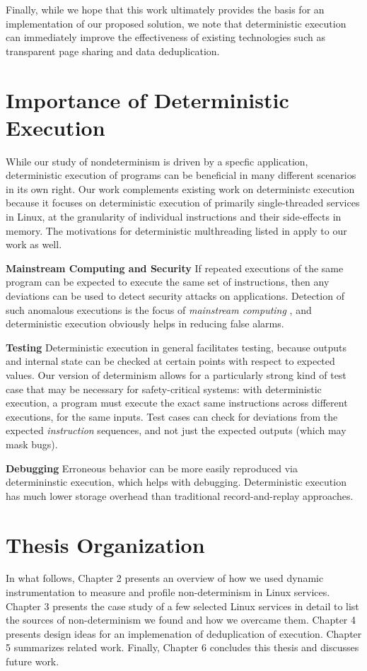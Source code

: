 Finally, while we hope that this work ultimately provides the basis for an implementation of our
proposed solution, we note that deterministic execution can immediately improve
the effectiveness of existing technologies such as transparent page sharing
and data deduplication.

\section{Importance of Deterministic Execution}
While our study of nondeterminism is driven by a specfic application,
deterministic execution of programs can be beneficial in many
different scenarios in its own right. Our work complements existing
work on deterministc execution because 
it focuses on deterministic execution of primarily single-threaded services in Linux,
at the granularity of individual instructions and their side-effects in
memory. The motivations for deterministic multhreading listed in
\cite{marek2011scaling, patil2010pinplay} apply to our work as well.

{\bf Mainstream Computing and Security} \newline
If repeated executions of the same program can be
expected to execute the same set of instructions, then
any deviations can be used to detect security
attacks on applications. Detection of such
anomalous executions is the focus of \emph{mainstream computing} \cite{stephenson2010mainstream},
and deterministic execution obviously helps in reducing false alarms.

{\bf Testing} \newline
Deterministic execution in general facilitates testing,
because outputs and internal state can be checked at 
certain points with respect to expected values. Our version
of determinism allows for a particularly strong kind
of test case that may be necessary for safety-critical 
systems: with deterministic execution, a program 
must execute the exact same instructions 
across different executions, for the same inputs.
Test cases can check for deviations from 
the expected \emph{instruction} sequences, and not
just the expected outputs (which may mask bugs).

{\bf Debugging} \newline
Erroneous behavior can be more easily reproduced
via determininstic execution, which
helps with debugging. Deterministic
execution has much lower storage overhead
than traditional record-and-replay approaches. 

\section{Thesis Organization}
In what follows, Chapter 2 presents an overview of
how we used dynamic instrumentation to measure
and profile non-determinism in Linux services.
Chapter 3 presents the case study of a few selected Linux services
in detail to list the sources of non-determinism we
found and how we overcame them. 
Chapter 4 presents design ideas for an implemenation of deduplication of execution.
Chapter 5 summarizes related work. Finally, Chapter 6 concludes this thesis
and discusses future work.


